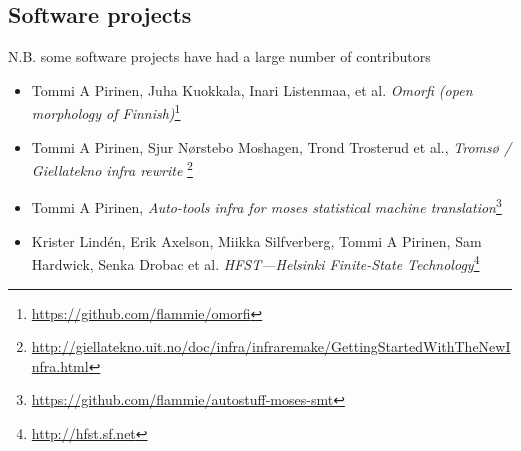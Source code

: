 \documentclass[a4paper]{article}
\begin{document}
\subsection{Software projects}

N.B. some software projects have had a large number of contributors

\begin{itemize}
\item Tommi A Pirinen, Juha Kuokkala, Inari Listenmaa, et al.\textit{ Omorfi (open morphology of Finnish)}\footnote{\url{https://github.com/flammie/omorfi}}
\item Tommi A Pirinen, Sjur Nørstebo Moshagen, Trond Trosterud et al., \textit{Tromsø / Giellatekno infra rewrite} \footnote{\url{http://giellatekno.uit.no/doc/infra/infraremake/GettingStartedWithTheNewInfra.html}}
\item Tommi A Pirinen, \textit{Auto-tools infra for moses statistical machine translation}\footnote{\url{https://github.com/flammie/autostuff-moses-smt}}
\item Krister Lindén, Erik Axelson, Miikka Silfverberg, Tommi A Pirinen, Sam Hardwick, Senka Drobac et al. \textit{HFST---Helsinki Finite-State Technology}\footnote{\url{http://hfst.sf.net}}
\end{itemize}
\end{document}

